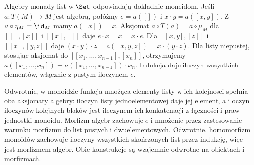 \begin{przyklad}\label{cat:ex:list-algebras}
Algebry monady list w $\Set$ odpowiadają dokładnie monoidom. Jeśli $a:T(M)\to M$ jest algebrą, połóżmy $e=a([])$ i $x\cdot y=a([x,y])$. Z $a\circ\eta_M=\id_M$ mamy $a([x])=x$. Aksjomat $a\circ T(a)=a\circ\mu_M$ dla $[[],[x]]$ i $[[x],[]]$ daje $e\cdot x=x=x\cdot e$. Dla $[[x,y],[z]]$ i $[[x],[y,z]]$ daje $(x\cdot y)\cdot z=a([x,y,z])=x\cdot(y\cdot z)$. Dla listy niepustej, stosując aksjomat do $[[x_1,\ldots,x_{n-1}],[x_n]]$, otrzymujemy $a([x_1,\ldots,x_n])=a([x_1,\ldots,x_{n-1}])\cdot x_n$. Indukcja daje iloczyn wszystkich elementów, włącznie z pustym iloczynem $e$.

Odwrotnie, w monoidzie funkcja mnożąca elementy listy w ich kolejności spełnia oba aksjomaty algebry: iloczyn listy jednoelementowej daje jej element, a iloczyn iloczynów kolejnych bloków jest iloczynem ich konkatenacji z łączności i praw jednostki monoidu. Morfizm algebr zachowuje $e$ i mnożenie przez zastosowanie warunku morfizmu do list pustych i dwuelementowych. Odwrotnie, homomorfizm monoidów zachowuje iloczyny wszystkich skończonych list przez indukcję, więc jest morfizmem algebr. Obie konstrukcje są wzajemnie odwrotne na obiektach i morfizmach.
\end{przyklad}
